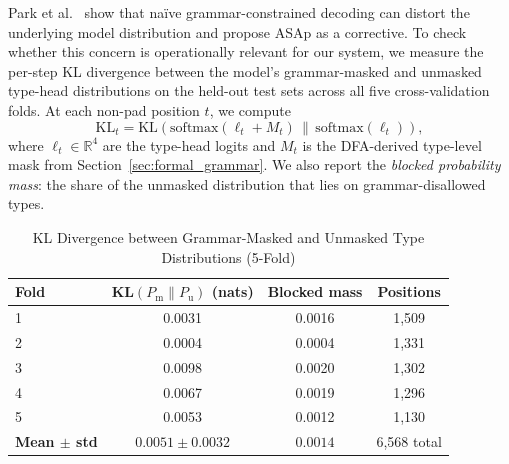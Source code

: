 \documentclass[sensors,article,submit,moreauthors,pdftex]{Definitions/mdpi}
\begin{document}
Park et al.~\cite{grammar_aligned} show that na\"ive grammar-constrained decoding can distort the underlying model distribution and propose ASAp as a corrective. To check whether this concern is operationally relevant for our system, we measure the per-step KL divergence between the model's grammar-masked and unmasked type-head distributions on the held-out test sets across all five cross-validation folds. At each non-pad position $t$, we compute
\[
\text{KL}_t = \mathrm{KL}\!\left(\mathrm{softmax}(\ell_t + M_t)\,\|\,\mathrm{softmax}(\ell_t)\right),
\]
where $\ell_t \in \mathbb{R}^4$ are the type-head logits and $M_t$ is the DFA-derived type-level mask from Section~\ref{sec:formal_grammar}. We also report the \emph{blocked probability mass}: the share of the unmasked distribution that lies on grammar-disallowed types.

\begin{table}[htbp]
\centering
\caption{KL Divergence between Grammar-Masked and Unmasked Type Distributions (5-Fold)}
\label{tab:kl_distortion}
\scriptsize
\begin{tabular}{@{}lccc@{}}
\toprule
\textbf{Fold} & \textbf{KL$(P_{\mathrm{m}}\!\|\!P_{\mathrm{u}})$} (nats) & \textbf{Blocked mass} & \textbf{Positions} \\
\midrule
1 & 0.0031 & 0.0016 & 1{,}509 \\
2 & 0.0004 & 0.0004 & 1{,}331 \\
3 & 0.0098 & 0.0020 & 1{,}302 \\
4 & 0.0067 & 0.0019 & 1{,}296 \\
5 & 0.0053 & 0.0012 & 1{,}130 \\
\midrule
\textbf{Mean $\pm$ std} & $\boldsymbol{0.0051 \pm 0.0032}$ & $\boldsymbol{0.0014}$ & 6{,}568 total \\
\bottomrule
\end{tabular}
\normalsize
\end{table}
\end{document}
